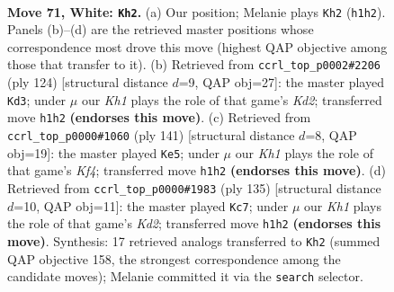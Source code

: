 \documentclass[11pt]{article}
\begin{document}
\clearpage

\begin{figure}[p]\centering
\begin{subfigure}{0.46\textwidth}\centering
\resizebox{\linewidth}{!}{%
\newchessgame
\chessboard[
  setfen={2n1k3/8/R7/8/p5r1/P6p/8/7K w - - 0 71},
  showmover=false,
  pgfstyle=straightmove, color=movearrow, markmove={h1-h2}
]}
\caption{}
\end{subfigure}\hfill
\begin{subfigure}{0.46\textwidth}\centering
\resizebox{\linewidth}{!}{%
\newchessgame
\chessboard[
  setfen={8/1k6/3R4/p7/P1rp4/8/3K4/8 w - - 0 63},
  showmover=false,
  pgfstyle=straightmove, color=movearrow, markmove={d2-d3}
]}
\caption{}
\end{subfigure}
\\[4pt]
\begin{subfigure}{0.46\textwidth}\centering
\resizebox{\linewidth}{!}{%
\newchessgame
\chessboard[
  setfen={8/8/8/5k1p/PR5P/4K3/r7/8 b - - 1 71},
  showmover=false,
  pgfstyle=straightmove, color=movearrow, markmove={f5-e5}
]}
\caption{}
\end{subfigure}\hfill
\begin{subfigure}{0.46\textwidth}\centering
\resizebox{\linewidth}{!}{%
\newchessgame
\chessboard[
  setfen={8/3k4/5p2/1P6/5R1P/7r/2K5/8 b - - 0 68},
  showmover=false,
  pgfstyle=straightmove, color=movearrow, markmove={d7-c7}
]}
\caption{}
\end{subfigure}
\caption{\textbf{Move 71, White: \texttt{Kh2}.} (a) Our position; Melanie plays \texttt{Kh2} (\texttt{h1h2}). Panels (b)--(d) are the retrieved master positions whose correspondence most drove this move (highest QAP objective among those that transfer to it). (b) Retrieved from \texttt{ccrl\_top\_p0002\#2206} (ply 124) [structural distance $d$=9, QAP obj=27]: the master played \texttt{Kd3}; under $\mu$ our \emph{Kh1} plays the role of that game's \emph{Kd2}; transferred move \texttt{h1h2} \textbf{(endorses this move)}. (c) Retrieved from \texttt{ccrl\_top\_p0000\#1060} (ply 141) [structural distance $d$=8, QAP obj=19]: the master played \texttt{Ke5}; under $\mu$ our \emph{Kh1} plays the role of that game's \emph{Kf4}; transferred move \texttt{h1h2} \textbf{(endorses this move)}. (d) Retrieved from \texttt{ccrl\_top\_p0000\#1983} (ply 135) [structural distance $d$=10, QAP obj=11]: the master played \texttt{Kc7}; under $\mu$ our \emph{Kh1} plays the role of that game's \emph{Kd2}; transferred move \texttt{h1h2} \textbf{(endorses this move)}. Synthesis: 17 retrieved analogs transferred to \texttt{Kh2} (summed QAP objective 158, the strongest correspondence among the candidate moves); Melanie committed it via the \texttt{search} selector.}
\label{fig:thought-m140}
\end{figure}
\end{document}
